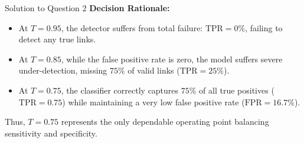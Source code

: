 \documentclass[11pt,a4paper]{article}
\begin{document}
\begin{solutionbox}{Solution to Question 2}
\textbf{Decision Rationale:}
\begin{itemize}
    \item At $T = 0.95$, the detector suffers from total failure: $\text{TPR} = 0\%$, failing to detect any true links.
    \item At $T = 0.85$, while the false positive rate is zero, the model suffers severe under-detection, missing $75\%$ of valid links ($\text{TPR} = 25\%$).
    \item At $T = 0.75$, the classifier correctly captures $75\%$ of all true positives ($\text{TPR} = 0.75$) while maintaining a very low false positive rate ($\text{FPR} = 16.7\%$).
\end{itemize}
Thus, $T = 0.75$ represents the only dependable operating point balancing sensitivity and specificity.
\end{solutionbox}

\bigskip
\end{document}
